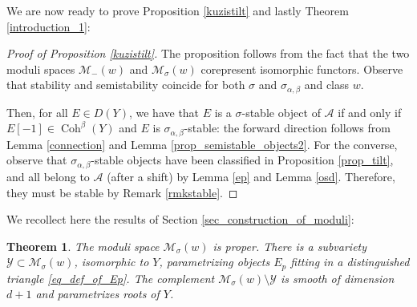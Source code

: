 \documentclass[11pt]{amsart}
\newtheorem{thm}{Theorem}[section]
\theoremstyle{definition}
\newcommand{\C}{\mathbb{C}}
\DeclareMathOperator{\Coh}{Coh}
\newcommand{\sA}{\mathcal{A}}
\newcommand{\sO}{\mathcal{O}}
\newcommand{\sY}{\mathcal{Y}}
\newcommand{\sM}{\mathcal{M}}
\newcommand{\AAA}[1]{\textcolor{red}{#1}}
\newcommand{\Ku}{\mathsf{Ku}}
\begin{document}
We are now ready to prove Proposition \ref{kuzistilt} and lastly Theorem \ref{introduction_1}:

\begin{proof}[Proof of Proposition \ref{kuzistilt}]
The proposition follows from the fact that the two moduli spaces $\sM_-(w)$ and $\sM_\sigma(w)$ corepresent isomorphic functors. Observe that stability and semistability coincide for both $\sigma$ and $\sigma_{\alpha,\beta}$ and class $w$. 

Then, for all $E\in D(Y)$, we have that $E$ is a $\sigma$-stable object of $\sA$ if and only if $E[-1]\in\Coh^\beta(Y)$ and $E$ is $\sigma_{\alpha,\beta}$-stable: the forward direction follows from Lemma \ref{connection} and Lemma \ref{prop_semistable_objects2}. For the converse, observe that $\sigma_{\alpha,\beta}$-stable objects have been classified in Proposition \ref{prop_tilt}, and all belong to $\sA$ (after a shift) by Lemma \ref{ep} and Lemma \ref{osd}. Therefore, they must be stable by Remark \ref{rmkstable}.
\end{proof}

We recollect here the results of Section \ref{sec_construction_of_moduli}:

\begin{thm}\label{thm_Section2}
The moduli space $\sM_\sigma(w)$ is proper. There is a subvariety $\sY \subset \sM_\sigma(w)$, isomorphic to $Y$, parametrizing objects $E_p$ fitting in a distinguished triangle \eqref{eq_def_of_Ep}. The complement $\sM_\sigma(w)\setminus \sY$ is smooth of dimension $d+1$ and parametrizes roots of $Y$.
\end{thm}
\end{document}
